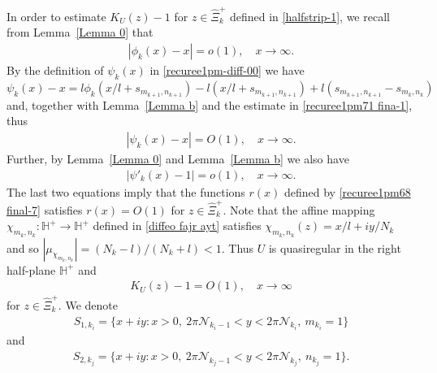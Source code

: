\documentclass[12pt]{amsart}
\numberwithin{equation}{section}
\begin{document}
In order to estimate $K_U(z)-1$ for $z\in \hat{\Xi}_k^{+}$ defined in \eqref{halfstrip-1}, we recall from Lemma~\ref{Lemma 0} that
\begin{equation}\label{recuree1pm71 fina-1}
\begin{split}
|\phi_{k}(x)-x|=o(1), \quad x\to\infty.
\end{split}
\end{equation}
By the definition of $\psi_k(x)$ in \eqref{recuree1pm-diff-00} we have
$\psi_{k}(x)-x=l\phi_{k}(x/l+s_{m_{k+1},n_{k+1}})-l(x/l+s_{m_{k+1},n_{k+1}})+l(s_{m_{k+1},n_{k+1}}-s_{m_k,n_k})$ and, together with Lemma~\ref{Lemma b} and the estimate in \eqref{recuree1pm71 fina-1}, thus
\begin{equation}\label{recuree1-main eqiqu-uy-1-pr-1}
\begin{split}
|\psi_{k}(x)-x|=O(1), \quad x\to\infty.
\end{split}
\end{equation}
Further, by Lemma~\ref{Lemma 0} and Lemma~\ref{Lemma b} we also have
\begin{equation*}%
\begin{split}
|\psi'_{k}(x)-1|=o(1), \quad x\to\infty.
\end{split}
\end{equation*}
The last two equations imply that the functions $r(x)$ defined by \eqref{recuree1pm68 final-7} satisfies $r(x)=O(1)$ for $z\in \hat{\Xi}_k^{+}$. Note that the affine mapping $\chi_{m_k,n_k}:\mathbb{H}^{+}\to \mathbb{H}^{+}$ defined in \eqref{diffeo  fajr  ayt} satisfies $\chi_{m_k,n_k}(z)=x/l+iy/N_k$ and so $|\mu_{\chi_{m_k,n_k}}|=(N_k-l)/(N_k+l)<1$. Thus $U$ is quasiregular in the right half-plane $\mathbb{H}^+$ and
\begin{equation*}%
\begin{split}
K_U(z)-1=O(1), \quad x\to\infty
\end{split}
\end{equation*}
for $z\in \hat{\Xi}_k^{+}$. We denote
\begin{equation*}%
\begin{split}
S_{1,k_i}=\{x+iy: x>0, \ 2\pi\mathcal{N}_{k_i-1}<y<2\pi \mathcal{N}_{k_i}, \ m_{k_i}=1\}
\end{split}
\end{equation*}
and
\begin{equation*}%
\begin{split}
S_{2,k_j}=\{x+iy: x>0, \ 2\pi\mathcal{N}_{k_j-1}<y<2\pi \mathcal{N}_{k_j}, \ n_{k_j}=1\}.
\end{split}
\end{equation*}
\end{document}

